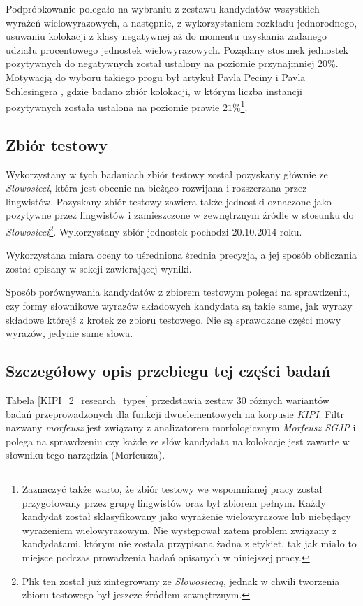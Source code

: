 \par
Podpróbkowanie polegało na wybraniu z zestawu kandydatów wszystkich wyrażeń wielowyrazowych, a następnie, z wykorzystaniem rozkładu jednorodnego, usuwaniu kolokacji z klasy negatywnej aż do momentu uzyskania zadanego udziału procentowego jednostek wielowyrazowych.
Pożądany stosunek jednostek pozytywnych do negatywnych został ustalony na poziomie przynajmniej $ 20\% $.
Motywacją do wyboru takiego progu był artykuł Pavla Peciny i Pavla Schlesingera \cite{coling}, gdzie badano zbiór kolokacji, w którym liczba instancji pozytywnych została ustalona na poziomie prawie $ 21\% $\footnote{Zaznaczyć także warto, że zbiór testowy we wspomnianej pracy został przygotowany przez grupę lingwistów oraz był zbiorem pełnym. Każdy kandydat został sklasyfikowany jako wyrażenie wielowyrazowe lub niebędący wyrażeniem wielowyrazowym. Nie występował zatem problem związany z kandydatami, którym nie została przypisana żadna z etykiet, tak jak miało to miejsce podczas prowadzenia badań opisanych w niniejszej pracy.}.


\subsection{Zbiór testowy}
Wykorzystany w tych badaniach zbiór testowy został pozyskany głównie ze \emph{Słowosieci}, która jest obecnie na bieżąco rozwijana i rozszerzana przez lingwistów.
Pozyskany zbiór testowy zawiera także jednostki oznaczone jako pozytywne przez lingwistów i zamieszczone w zewnętrznym źródle w stosunku do \emph{Słowosieci}\footnote{Plik ten został już zintegrowany ze \emph{Słowosiecią}, jednak w chwili tworzenia zbioru testowego był jeszcze źródłem zewnętrznym.}.
Wykorzystany zbiór jednostek pochodzi 20.10.2014 roku.

\par
Wykorzystana miara oceny to uśredniona średnia precyzja, a jej sposób obliczania został opisany w sekcji zawierającej wyniki.

\par
Sposób porównywania kandydatów z zbiorem testowym polegał na sprawdzeniu, czy formy słownikowe wyrazów składowych kandydata są takie same, jak wyrazy składowe którejś z krotek ze zbioru testowego.
Nie są sprawdzane części mowy wyrazów, jedynie same słowa.


\subsection{Szczegółowy opis przebiegu tej części badań}
Tabela \ref{KIPI_2_research_types} przedstawia zestaw 30 różnych wariantów badań przeprowadzonych dla funkcji dwuelementowych na korpusie \emph{KIPI}.
Filtr nazwany \emph{morfeusz} jest związany z analizatorem morfologicznym \emph{Morfeusz SGJP} \cite{morfeusz} i polega na sprawdzeniu czy każde ze słów kandydata na kolokacje jest zawarte w słowniku tego narzędzia (Morfeusza).

